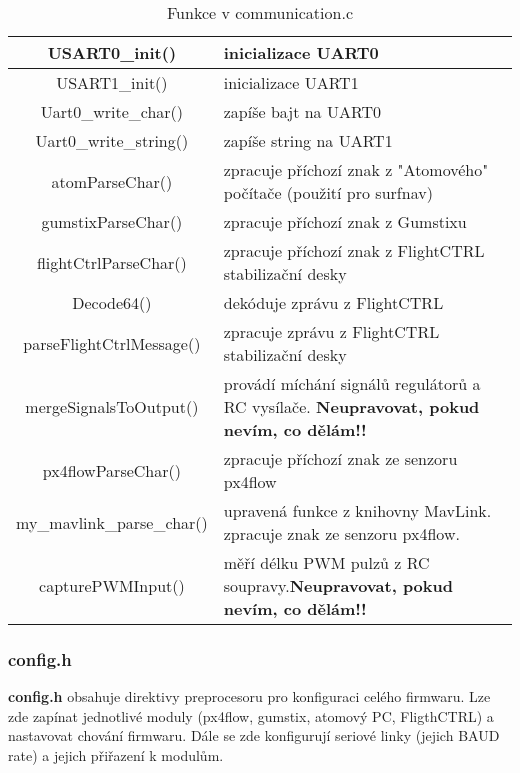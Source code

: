 \documentclass[11pt, a4paper]{article}
\begin{document}
\begin{table}
\begin{center}
\begin{tabular}{| c | p{8cm} |}
\hline
USART0\_init() & inicializace UART0\\
\hline
USART1\_init() & inicializace UART1\\
\hline
Uart0\_write\_char() & zapíše bajt na UART0\\
\hline
Uart0\_write\_string() & zapíše string na UART1\\
\hline
atomParseChar() & zpracuje příchozí znak z "Atomového" počítače (použití pro surfnav)\\
\hline
gumstixParseChar() & zpracuje příchozí znak z Gumstixu\\
\hline
flightCtrlParseChar() & zpracuje příchozí znak z FlightCTRL stabilizační desky\\
\hline
Decode64() & dekóduje zprávu z FlightCTRL\\
\hline
parseFlightCtrlMessage() & zpracuje zprávu z FlightCTRL stabilizační desky\\
\hline
mergeSignalsToOutput() & provádí míchání signálů regulátorů a RC vysílače. \newline \textbf{Neupravovat, pokud nevím, co dělám!!}\\
\hline
px4flowParseChar() & zpracuje příchozí znak ze senzoru px4flow\\
\hline
my\_mavlink\_parse\_char() & upravená funkce z knihovny MavLink. zpracuje znak ze senzoru px4flow.\\
\hline
capturePWMInput() & měří délku PWM pulzů z RC soupravy.\newline \textbf{Neupravovat, pokud nevím, co dělám!!}\\
\hline
\end{tabular}
\caption{Funkce v communication.c}
\label{tab:communication.c}
\end{center}
\end{table}

\subsubsection{config.h}

\textbf{config.h} obsahuje direktivy preprocesoru pro konfiguraci celého firmwaru. Lze zde zapínat jednotlivé moduly (px4flow, gumstix, atomový PC, FligthCTRL) a nastavovat chování firmwaru. Dále se zde konfigurují seriové linky (jejich BAUD rate) a jejich přiřazení k modulům.
\end{document}
